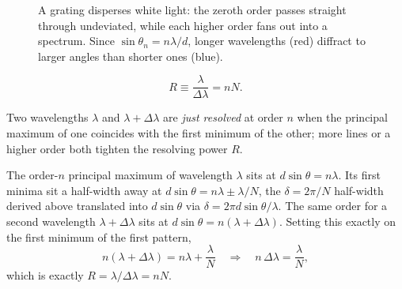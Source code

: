 \begin{figure}[ht]
    \centering
    \caption{A grating disperses white light: the zeroth order passes straight through undeviated, while each higher order fans out into a spectrum. Since $\sin\theta_n = n\lambda/d$, longer wavelengths (red) diffract to larger angles than shorter ones (blue).}
    \label{fig:grating-dispersion}
\end{figure}

\begin{fact}
\begin{equation}
    R \equiv \frac{\lambda}{\Delta\lambda} = nN.
\end{equation}
\end{fact}

Two wavelengths $\lambda$ and $\lambda+\Delta\lambda$ are \emph{just resolved} at order $n$ when the principal maximum of one coincides with the first minimum of the other; more lines or a higher order both tighten the resolving power $R$.

\begin{example}[Deriving the resolving power $R = nN$]
The order-$n$ principal maximum of wavelength $\lambda$ sits at $d\sin\theta = n\lambda$. Its first minima sit a half-width away at $d\sin\theta = n\lambda \pm \lambda/N$, the $\delta = 2\pi/N$ half-width derived above translated into $d\sin\theta$ via $\delta = 2\pi d\sin\theta/\lambda$. The same order for a second wavelength $\lambda+\Delta\lambda$ sits at $d\sin\theta = n(\lambda+\Delta\lambda)$. Setting this exactly on the first minimum of the first pattern,
\[
    n(\lambda + \Delta\lambda) = n\lambda + \frac{\lambda}{N}
    \quad\Longrightarrow\quad
    n\,\Delta\lambda = \frac{\lambda}{N},
\]
which is exactly $R = \lambda/\Delta\lambda = nN$.
\end{example}

